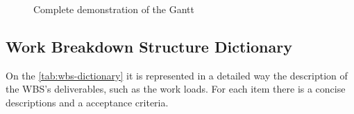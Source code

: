 \begin{figure}
    \centering
    \caption{Complete demonstration of the Gantt}
    \label{fig:gantt_complete}
\end{figure}

\subsection{Work Breakdown Structure Dictionary}

On the \ref{tab:wbs-dictionary} it is represented in a detailed way the description of the \gls{WBS}'s deliverables, such as the work loads. For each item there is a concise descriptions and a acceptance criteria.


